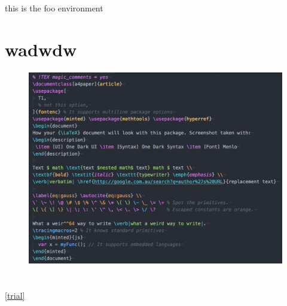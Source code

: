 \documentclass{article}
\begin{document}
\begin{foo} this is the foo environment \end{foo}


\section{wadwdw}
  



\begin{figure}[h t p b] %
  \centering
  \includegraphics[width=\textwidth]{fig1.png}
\caption{}
  \label{}
\end{figure}
\section{}

\ref{trial}

\cites[][]{world}
\end{document}
